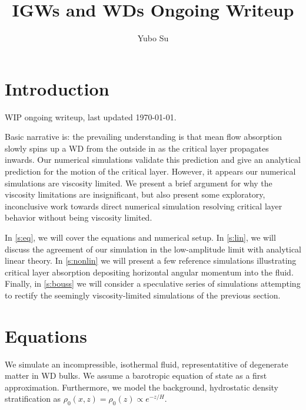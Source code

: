 \documentclass[twocolumn,
        usenames, %
        dvipsnames %
    ]{revtex4-1}%
\begin{document}
\def\Snospace~{\S{}} %
\renewcommand*{\sectionautorefname}{\Snospace}
\renewcommand*{\appendixautorefname}{\Snospace}
\renewcommand*{\figureautorefname}{Fig.}
\renewcommand*{\equationautorefname}{Eq.}
\renewcommand*{\tableautorefname}{Tab.}

\title{IGWs and WDs Ongoing Writeup}
\author{Yubo Su}
\maketitle

\section{Introduction}

WIP ongoing writeup, last updated \today.


Basic narrative is: the prevailing understanding is that mean flow absorption
slowly spins up a WD from the outside in as the critical layer propagates
inwards. Our numerical simulations validate this prediction and give an
analytical prediction for the motion of the critical layer. However, it appears
our numerical simulations are viscosity limited. We present a brief argument for
why the viscosity limitations are insignificant, but also present some
exploratory, inconclusive work towards direct numerical simulation resolving
critical layer behavior without being viscosity limited.

In \autoref{s:eq}, we will cover the equations and numerical setup. In
\autoref{s:lin}, we will discuss the agreement of our simulation in the
low-amplitude limit with analytical linear theory. In \autoref{s:nonlin} we will
present a few reference simulations illustrating critical layer absorption
depositing horizontal angular momentum into the fluid. Finally, in
\autoref{s:bouss} we will consider a speculative series of simulations
attempting to rectify the seemingly viscosity-limited simulations of the
previous section.

\section{Equations}\label{s:eq}

We simulate an incompressible, isothermal fluid, representatitive of degenerate
matter in WD bulks. We assume a barotropic equation of state as a first
approximation. Furthermore, we model the background, hydrostatic density
stratification as $\rho_0(x, z) = \rho_0(z) \propto e^{-z/H}$.
\end{document}
